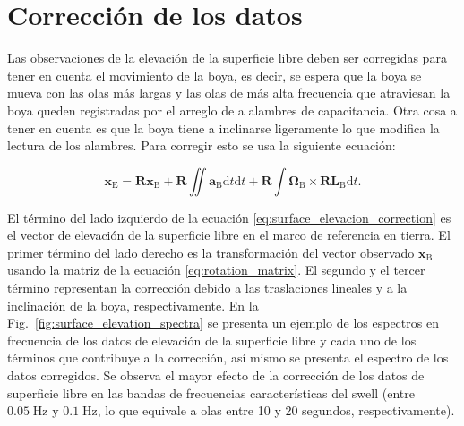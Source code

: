 \documentclass[11pt]{article}
\begin{document}


\section{Corrección de los datos}

Las observaciones de la elevación de la superficie libre deben ser corregidas
para tener en cuenta el movimiento de la boya, es decir, se espera que la boya
se mueva con las olas más largas y las olas de más alta frecuencia que
atraviesan la boya queden registradas por el arreglo de a alambres de
capacitancia. Otra cosa a tener en cuenta es que la boya tiene a inclinarse
ligeramente lo que modifica la lectura de los alambres. Para corregir esto se
usa la siguiente ecuación:

\begin{equation}
  \mathbf{x}_\mathrm{E} =
    \mathbf{R} \mathbf{x}_\mathrm{B} + 
    \mathbf{R} \displaystyle\iint \mathbf{a}_\mathrm{B} \mathrm{d}t \mathrm{d}t +
    \mathbf{R} \int \boldsymbol{\Omega}_\mathrm{B} \times \mathbf{R} 
                \mathbf{L}_\mathrm{B} \mathrm{d}t.
\label{eq:surface_elevacion_correction}
\end{equation}

El término del lado izquierdo de la ecuación
\eqref{eq:surface_elevacion_correction} es el vector de elevación de la
superficie libre en el marco de referencia en tierra. El primer término del lado
derecho es la transformación del vector observado $\mathbf{x}_\mathrm{B}$ usando
la matriz de la ecuación \eqref{eq:rotation_matrix}. El segundo y el tercer
término representan la corrección debido a las traslaciones lineales y a la
inclinación de la boya, respectivamente. En la
Fig.~\ref{fig:surface_elevation_spectra} se presenta un ejemplo de los espectros
en frecuencia de los datos de elevación de la superficie libre y cada uno de los
términos que contribuye a la corrección, así mismo se presenta el espectro de
los datos corregidos. Se observa el mayor efecto de la corrección de los datos
de superficie libre en las bandas de frecuencias características del swell
(entre $0.05\;\mathrm{Hz}$ y $0.1\;\mathrm{Hz}$, lo que equivale a olas entre 10
y 20 segundos, respectivamente).
\end{document}
